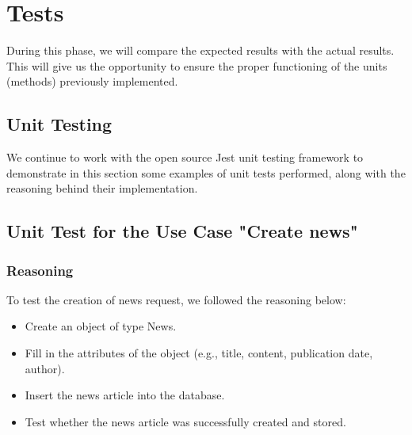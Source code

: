 \section{Tests}
During this phase, we will compare the expected results with the actual results.
This will give us the opportunity to ensure the proper functioning of the units (methods) previously implemented.

\subsection{Unit Testing}
We continue to work with the open source Jest unit testing framework to demonstrate in this section some examples of unit tests performed, along with the reasoning behind their implementation.

\subsection{ Unit Test for the Use Case "Create news"}
\subsubsection{Reasoning}
To test the creation of news request, we followed the reasoning below:
\begin{itemize}
    \item Create an object of type News.
    \item Fill in the attributes of the object (e.g., title, content, publication date, author).
    \item Insert the news article into the database.
    \item Test whether the news article was successfully created and stored.
\end{itemize}
